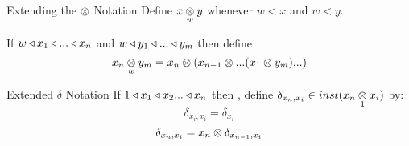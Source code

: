 \newcommand{\inningsCrossSide}{\crossx{innings\kern-0.3cm}{\kern-0.3cm side}{match}}
\newcommand{\inningsCrossPlayer}{\crossx{innings\kern-0.3cm}{\kern-0.3cm player}{match}}
\newcommand{\fieldingSidePlayer}{fieldingSide ^* (\inningsCrossPlayer)}
\newcommand{\battingSidePlayer}{battingSide ^* (\inningsCrossPlayer)}
\newcommand{\overCrossFieldingSidePlayer}{\crossx{over\kern-0.4cm}{\kern-0.4cm(\fieldingSidePlayer)}{innings}}
\newcommand{\deliveryCrossBattingSidePlayer}{\crossx{delivery\kern-0.4cm}{\kern-0.4cm (\battingSidePlayer)}{innings}}

\begin{frame}{Extending the $\crossx{}{}{}$ Notation}
Define $\crossx{x}{y}{w}$ whenever $w < x$ and $w<y$.

If $w \base x_1 \base ... \base x_n $
and $w \base y_1 \base ... \base y_m$ then define 
$$\crossx{x_n}{y_m}{w}=x_n \cross ( x_{n-1} \cross ... (x_1 \cross y_m)...)$$
\pause
\begin{center}

\end{center}
\end{frame}

\begin{frame}{Extended $\delta$ Notation}
If $1 \base x_1 \base x_2 ... \base x_n$
then \foreachi, define 
$\delta_{x_n,x_i} \in inst(\crossx{x_n}{x_i}{1})$ by:
$$\delta_{x_i,x_i}=\delta_{x_i}$$
$$\delta_{x_n,x_i}=x_n \cross \delta_{x_{n-1},x_i}$$
\begin{center}
\end{center}
\end{frame}

